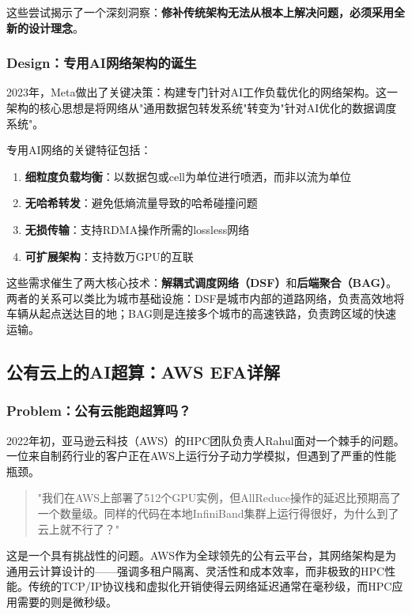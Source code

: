 这些尝试揭示了一个深刻洞察：\textbf{修补传统架构无法从根本上解决问题，必须采用全新的设计理念}。

\subsubsection{Design：专用AI网络架构的诞生}

2023年，Meta做出了关键决策：构建专门针对AI工作负载优化的网络架构。这一架构的核心思想是将网络从"通用数据包转发系统"转变为"针对AI优化的数据调度系统"。

专用AI网络的关键特征包括：

\begin{enumerate}
    \item \textbf{细粒度负载均衡}：以数据包或cell为单位进行喷洒，而非以流为单位
    \item \textbf{无哈希转发}：避免低熵流量导致的哈希碰撞问题
    \item \textbf{无损传输}：支持RDMA操作所需的lossless网络
    \item \textbf{可扩展架构}：支持数万GPU的互联
\end{enumerate}

这些需求催生了两大核心技术：\textbf{解耦式调度网络（DSF）}和\textbf{后端聚合（BAG）}。两者的关系可以类比为城市基础设施：DSF是城市内部的道路网络，负责高效地将车辆从起点送达目的地；BAG则是连接多个城市的高速铁路，负责跨区域的快速运输。

\subsection{公有云上的AI超算：AWS EFA详解}

\subsubsection{Problem：公有云能跑超算吗？}

2022年初，亚马逊云科技（AWS）的HPC团队负责人Rahul面对一个棘手的问题。一位来自制药行业的客户正在AWS上运行分子动力学模拟，但遇到了严重的性能瓶颈。

\begin{quote}
"我们在AWS上部署了512个GPU实例，但AllReduce操作的延迟比预期高了一个数量级。同样的代码在本地InfiniBand集群上运行得很好，为什么到了云上就不行了？"
\end{quote}

这是一个具有挑战性的问题。AWS作为全球领先的公有云平台，其网络架构是为通用云计算设计的——强调多租户隔离、灵活性和成本效率，而非极致的HPC性能。传统的TCP/IP协议栈和虚拟化开销使得云网络延迟通常在毫秒级，而HPC应用需要的则是微秒级。

